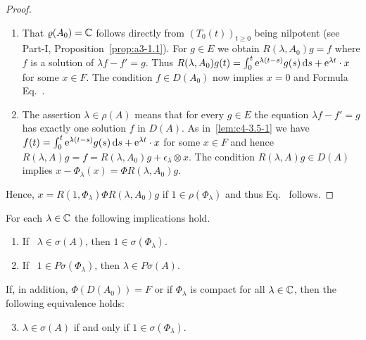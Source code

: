 \begin{proof}
\begin{enumerate}[\upshape (i), wide, labelindent=.25em] 
    \item 
    That $\rho(A_{0}) = \C$ follows directly from $(T_{0}(t))_{t \geq 0}$ being nilpotent (see Part-I, Proposition~\ref{prop:a3-1.1}). For $g \in E$ we obtain $R(\lambda,A_{0})g = f$ where $f$ is a solution of\/ $\lambda f - f' = g$.
    Thus $R(\lambda,A_{0})g(t) = \int_{0}^{t} \mathrm{e}^{\lambda(t-s)}g(s)\mathop{}\!\mathrm{d}{s} + \mathrm{e}^{\lambda t} \cdot x$ for some $x \in F$. The condition $f \in D(A_{0})$ now implies $x = 0$ and Formula Eq.~.
    
    \item 
    The assertion $\lambda \in \rho(A)$ means that for every $g \in E$ the equation $\lambda f - f' = g$ has exactly one solution $f$ in $D(A)$. As in~\ref{lem:c4-3.5-1} we have 
    $f(t) = \int_{0}^{t} \mathrm{e}^{\lambda(t-s)}g(s)\mathop{}\!\mathrm{d}{s} + \mathrm{e}^{\lambda t} \cdot x$ for some $x \in F$ and hence
    $R(\lambda,A)g = f = R(\lambda,A_{0})g + \epsilon_{\lambda}  \otimes x$. 
    The condition $R(\lambda,A)g \in D(A)$ implies $x - \Phi_{\lambda}(x) = \Phi R(\lambda,A_{0})g$. 
\end{enumerate}    
    Hence, $x = R(1,\Phi_{\lambda})\Phi R(\lambda,A_{0})g$ if\/ $1 \in \rho(\Phi_{\lambda})$ and thus Eq.~ follows.
\end{proof}
\begin{proposition}\label{prop:c4-3.6}
For each $\lambda \in \mathbb{C}$ the following implications hold.
\begin{enumerate}[\upshape (i)]
\item \label{prop:c4-3.6-1}
If \, $\lambda \in \sigma(A)$, then $1 \in \sigma(\Phi_{\lambda})$.
\item \label{prop:c4-3.6-2}
If \, $1 \in P\sigma(\Phi_{\lambda})$, then $\lambda \in P\sigma(A)$.
\end{enumerate}
If, in addition, $\Phi(D(A_{0})) = F$ or if\/ $\Phi_{\lambda}$ is compact for all $\lambda \in \mathbb{C}$, then the following equivalence holds:
\begin{enumerate}[\upshape (i)]
\setcounter{enumi}{2}
\item \label{prop:c4-3.6-3}
$\lambda \in \sigma(A)$ if and only if\/ $1 \in \sigma(\Phi_{\lambda})$.
\end{enumerate}
\end{proposition}
